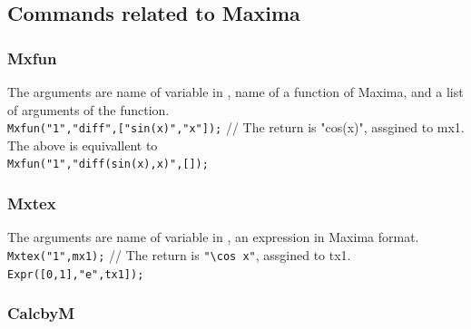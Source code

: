 \documentclass[papersize,a4paper,12pt]{article}
\begin{document}
\subsection{Commands related to Maxima}

\subsubsection*{Mxfun}

The arguments are name of variable in \ketcindy, name of a function of Maxima, and a list of arguments of the function.\\
\hspace*{10mm}\verb|Mxfun("1","diff",["sin(x)","x"]);|  // The return is "cos(x)", assgined to mx1.\\
The above is equivallent to\\
\hspace*{10mm}\verb|Mxfun("1","diff(sin(x),x)",[]);|


\subsubsection*{Mxtex}

The arguments are name of variable in \ketcindy, an expression in Maxima format.\\
\hspace*{10mm}\verb|Mxtex("1",mx1);|  // The return is \verb|"\cos x"|, assgined to tx1.\\
\hspace*{10mm}\verb|Expr([0,1],"e",tx1]);|

\begin{center}

\end{center}

\subsubsection*{CalcbyM}
\end{document}

